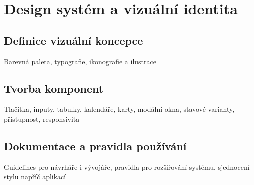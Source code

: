 \chapter{Design systém a vizuální identita}

\section{Definice vizuální koncepce}
Barevná paleta, typografie, ikonografie a ilustrace

\section{Tvorba komponent}
Tlačítka, inputy, tabulky, kalendáře, karty, modální okna, stavové varianty, přístupnost, responsivita

\section{Dokumentace a pravidla používání}
Guidelines pro návrháře i vývojáře, pravidla pro rozšiřování systému, sjednocení stylu napříč aplikací

